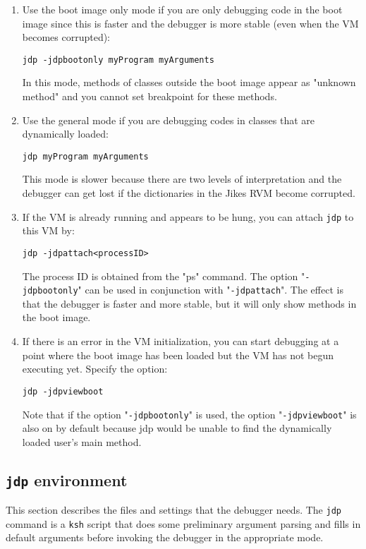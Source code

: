 \begin{enumerate}
\item Use the boot image only mode if you are only debugging code
in the boot image since this is faster and the debugger is more stable
(even when the VM becomes corrupted):
\begin{verbatim}
jdp -jdpbootonly myProgram myArguments
\end{verbatim}
   In this mode, methods of classes outside the boot image appear
as "unknown method" and you cannot set breakpoint for these methods.


\item Use the general mode if you are debugging codes in classes that are 
dynamically loaded:
\begin{verbatim}
jdp myProgram myArguments
\end{verbatim}
   This mode is slower because there are two levels of interpretation
and the debugger can get lost if the dictionaries in the Jikes RVM become 
corrupted.


\item If the VM is already running and appears to be hung, you can attach 
{\tt jdp} to this VM by:
\begin{verbatim}
jdp -jdpattach<processID>
\end{verbatim}
   The process ID is obtained from the "ps" command.  
   The option "{\tt -jdpbootonly}" can be used in conjunction with 
   "{\tt -jdpattach}".  The effect is that the debugger is faster and more
   stable, but it will only show methods in the boot image.

\item If there is an error in the VM initialization, you can start debugging
 at a point where the boot image has been loaded but the VM has not begun
 executing yet. Specify the option:
\begin{verbatim}
jdp -jdpviewboot
\end{verbatim}
  Note that if the option "{\tt -jdpbootonly}" is used, the option 
  "{\tt -jdpviewboot}" is also on by default because jdp would be unable
  to find the dynamically loaded user's main method.


\end{enumerate}


\subsection{{\tt jdp} environment}

   This section describes the files and settings that the debugger
needs.  The {\tt jdp} command is a {\tt ksh} script that does some preliminary
argument parsing and fills in default arguments before invoking the
debugger in the appropriate mode.

